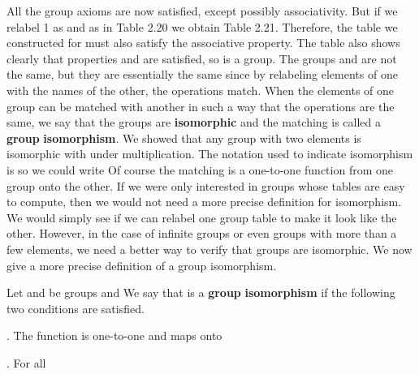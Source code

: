 \documentclass[11pt,oneside]{article}
\begin{document}
\begin{BookBody}
All the group axioms are now satisfied, except possibly associativity. But if we relabel 1 as  and  as  in Table 2.20 we obtain Table 2.21. Therefore, the table we constructed for  must also satisfy  the associative property. The table also shows clearly that properties  and  are satisfied, so  is a group. The groups  and  are not the same, but they are essentially the same since by relabeling elements of one with the names of the other, the operations match. When the elements of one group can be matched with another in such a way that the operations are the same, we say that the groups are\textbf{ isomorphic} and the matching is called a\textbf{ group} \textbf{isomorphism}. We showed that any group with two elements is isomorphic with  under multiplication. The notation used to indicate isomorphism is \BookInline{\simeq,\allowbreak } so we could write  Of course the matching is a one-to-one function from one group onto the other. If we were only interested in groups whose tables are easy to compute, then we would not need a more precise definition for isomorphism. We would simply see if we can relabel one group table to make it look like the other. However, in the case of infinite groups or even groups with more than a few elements, we need a better way to verify that groups are isomorphic. We now give a more precise definition of a group isomorphism.

 Let  and  be groups and  We say that  is a\textbf{ group} \textbf{isomorphism} if the following two conditions are satisfied.

. The function  is one-to-one and maps onto 

. For all  \BookEnd{\blacksquare}


\end{BookBody}
\end{document}

